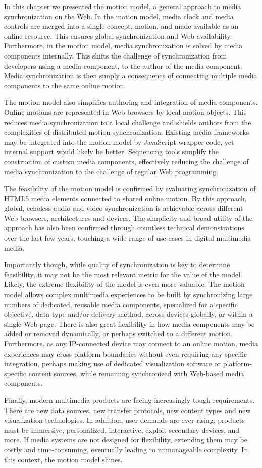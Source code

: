 In this chapter we presented the motion model, a general approach to media
synchronization on the Web. In the motion model, media clock and media
controls are merged into a single concept, motion, and made available as an
online resource. This ensures global synchronization and Web availability.
Furthermore, in the motion model, media synchronization is solved by media
components internally. This shifts the challenge of synchronization from
developers using a media component, to the author of the media component.
Media synchronization is then simply a consequence of connecting multiple media
components to the same online motion. 

The motion model also simplifies authoring and integration of media
components. Online motions are represented in Web browsers by local motion
objects. This reduces media synchronization to a local challenge and shields
authors from the complexities of distributed motion synchronization. Existing
media frameworks may be integrated into the motion model by JavaScript wrapper
code, yet internal support would likely be better. Sequencing tools simplify
the construction of custom media components, effectively reducing the
challenge of media synchronization to the challenge of regular Web
programming.

The feasibility of the motion model is confirmed by evaluating synchronization
of HTML5 media elements connected to shared online motion. By this approach,
global, echoless audio and video synchronization is achievable across
different Web browsers, architectures and devices. The simplicity and broad
utility of the approach has also been confirmed through countless technical
demonstrations over the last few years, touching a wide range of use-cases in
digital multimedia media.

Importantly though, while quality of synchronization is key to determine
feasibility, it may not be the most relevant metric for the value of the
model. Likely, the extreme flexibility of the model is even more valuable. The
motion model allows complex multimedia experiences to be built by
synchronizing large numbers of dedicated, reusable media components,
specialized for a specific objective, data type and/or delivery method, across
devices globally, or within a single Web page. There is also great flexibility
in how media components may be added or removed dynamically, or perhaps
switched to a different motion. Furthermore, as any IP-connected device may
connect to an online motion, media experiences may cross platform boundaries
without even requiring any specific integration, perhaps making use of
dedicated visualization software or platform-specific content sources, while
remaining synchronized with Web-based media components.

Finally, modern multimedia products are facing increasingly tough
requirements. There are new data sources, new transfer protocols, new content
types and new visualization technologies. In addition, user demands are ever
rising; products must be immersive, personalized, interactive, exploit
secondary devices, and more. If media systems are not designed for
flexibility, extending them may be costly and time-consuming, eventually
leading to unmanageable complexity. In this context, the motion model shines.

